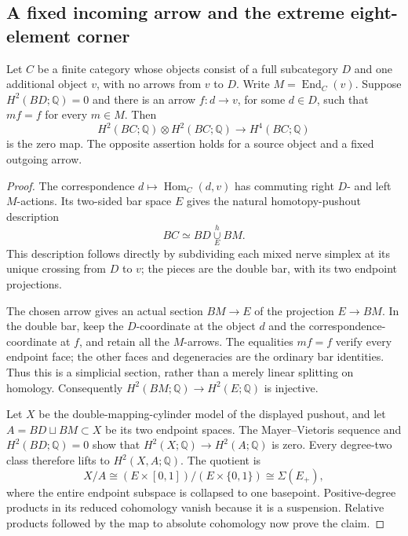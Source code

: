 \subsection{A fixed incoming arrow and the extreme eight-element corner}

\begin{lemma}
\label{C:fixed-incoming-cups}
Let $C$ be a finite category whose objects consist of a full subcategory
$D$ and one additional object $v$, with no arrows from $v$ to $D$.
Write $M=\operatorname{End}_C(v)$.  Suppose
$H^2(BD;\mathbb Q)=0$ and there is an arrow $f:d\to v$, for some
$d\in D$, such that $mf=f$ for every $m\in M$.
Then
\[
 H^2(BC;\mathbb Q)\otimes H^2(BC;\mathbb Q)
       \longrightarrow H^4(BC;\mathbb Q)
\]
is the zero map.  The opposite assertion holds for a source object
and a fixed outgoing arrow.
\end{lemma}
\begin{proof}
The correspondence $d\mapsto\operatorname{Hom}_C(d,v)$ has commuting
right $D$- and left $M$-actions.  Its two-sided bar space $E$ gives the
natural homotopy-pushout description
\[
 BC\simeq BD\mathop{\cup}\limits_E^h BM.
\]
This description follows directly by subdividing each mixed nerve simplex
at its unique crossing from $D$ to $v$; the pieces are the double bar,
with its two endpoint projections.

The chosen arrow gives an actual section $BM\to E$ of the projection
$E\to BM$.  In the double bar, keep the $D$-coordinate at the object $d$
and the correspondence-coordinate at $f$, and retain all the $M$-arrows.
The equalities $mf=f$ verify every endpoint face; the other faces and
degeneracies are the ordinary bar identities.  Thus this is a simplicial
section, rather than a merely linear splitting on homology.  Consequently
$H^2(BM;\mathbb Q)\to H^2(E;\mathbb Q)$ is injective.

Let $X$ be the double-mapping-cylinder model of the displayed pushout,
and let $A=BD\sqcup BM\subset X$ be its two endpoint spaces.
The Mayer--Vietoris sequence and $H^2(BD;\mathbb Q)=0$ show that
$H^2(X;\mathbb Q)\to H^2(A;\mathbb Q)$ is zero.  Every degree-two
class therefore lifts to $H^2(X,A;\mathbb Q)$.  The quotient is
\[
 X/A\cong (E\times[0,1])/(E\times\{0,1\})
       \cong \Sigma(E_+),
\]
where the entire endpoint subspace is collapsed to one basepoint.
Positive-degree products in its reduced cohomology vanish because it is
a suspension.  Relative products followed by the map to absolute
cohomology now prove the claim.
\end{proof}

